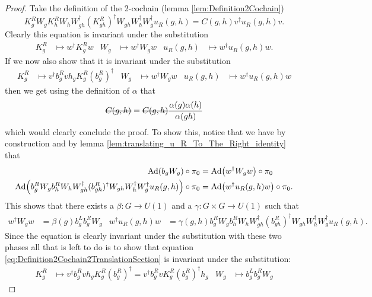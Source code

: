 \documentclass[12pt,a4paper,twoside]{article}
\numberwithin{equation}{section}
\begin{document}
\begin{proof}
	Take the definition of the 2-cochain (lemma \ref{lem:Definition2Cochain})
	\begin{equation}\label{eq:Definition2Cochain2TranslationSection}
		K_g^RW_gK_h^RW_hW_{gh}^\dagger(K_{gh}^R)^\dagger W_{gh}W_{h}^\dagger W_g^\dagger u_R(g,h)=C(g,h)v^\dagger u_R(g,h)v.
	\end{equation}
	Clearly this equation is invariant under the substitution
	\begin{align}
		K_g^R&\mapsto w^\dagger K_g^R w&W_g&\mapsto w^\dagger W_g w&u_R(g,h)&\mapsto w^\dagger u_R(g,h)w.
	\end{align}
	If we now also show that it is invariant under the substitution
	\begin{align}
		K_g^R&\mapsto v^\dagger b_g^R v h_g K_g^R (b_g^R)^\dagger&W_g&\mapsto w^\dagger W_g w&u_R(g,h)&\mapsto w^\dagger u_R(g,h)w
	\end{align}
	then we get using the definition of $\alpha$ that
	\begin{equation}
		\stkout{C(g,h)}=\stkout{C(g,h)}\frac{\alpha(g)\alpha(h)}{\alpha(gh)}
	\end{equation}
	which would clearly conclude the proof. To show this, notice that we have by construction and by lemma \ref{lem:translating_u_R_To_The_Right_identity} that
	\begin{align}
		\Ad{b_g W_g}\circ\pi_0&=\Ad{w^\dagger W_g w}\circ\pi_0\\
		\Ad{b_g^R W_g b_h^R W_h W_{gh}^\dagger (b_{gh}^R)^\dagger W_{gh}W_h^\dagger W_g^\dagger u_R(g,h)}\circ\pi_0&=\Ad{w^\dagger u_R(g,h) w}\circ\pi_0.
	\end{align}
	This shows that there exists a $\beta:G\rightarrow U(1)$ and a $\gamma:G\times G\rightarrow U(1)$ such that
	\begin{align}
		w^\dagger W_g w&=\beta(g)b_g^Lb_g^RW_g&w^\dagger u_R(g,h) w&=\gamma(g,h)b_g^R W_g b_h^R W_h W_{gh}^\dagger (b_{gh}^R)^\dagger W_{gh}W_h^\dagger W_g^\dagger u_R(g,h).
	\end{align}
	Since the equation is clearly invariant under the substitution with these two phases all that is left to do is to show that equation \eqref{eq:Definition2Cochain2TranslationSection} is invariant under the substitution:
	\begin{align}
		K_g^R&\mapsto v^\dagger b_g^R v h_g K_g^R (b_g^R)^\dagger=v^\dagger b_g^R v K_g^R (b_g^R)^\dagger h_g&W_g&\mapsto b_g^Lb_g^RW_g
	\end{align}
	\begin{equation}

\end{equation}
\end{proof}
\end{document}
